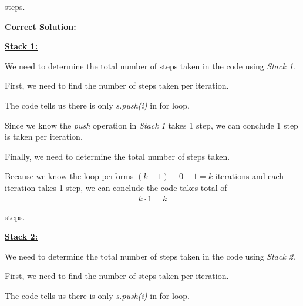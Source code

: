 \documentclass[12pt]{article}
\begin{document}
\begin{enumerate}[a.]
    steps.

    \bigskip

    \begin{mdframed}
        \underline{\textbf{Correct Solution:}}

        \bigskip

        \underline{\textbf{Stack 1:}}

        \bigskip

        We need to determine the total number of steps taken in the code using \textit{Stack 1}.

        \bigskip

        First, we need to find the number of steps taken per iteration.

        \bigskip

        The code tells us there is only \textit{s.push(i)} in for loop.

        \bigskip

        Since we know the \textit{push} operation in \textit{Stack 1} takes 1 step,
        we can conclude 1 step is taken per iteration.

        \bigskip

        Finally, we need to determine the total number of steps taken.

        \bigskip

        Because we know the loop performs $(k-1) - 0 + 1 = k$ iterations and each
        iteration takes 1 step, we can conclude the code takes total of
        \color{red}
        \setcounter{equation}{0}
        \begin{align}
            k \cdot 1 = k
        \end{align}
        \color{black}

        steps.

        \bigskip

        \underline{\textbf{Stack 2:}}

        \bigskip

        We need to determine the total number of steps taken in the code using \textit{Stack 2}.

        \bigskip

        First, we need to find the number of steps taken per iteration.

        \bigskip

        The code tells us there is only \textit{s.push(i)} in for loop.

        \bigskip


\end{mdframed}
\end{enumerate}
\end{document}
